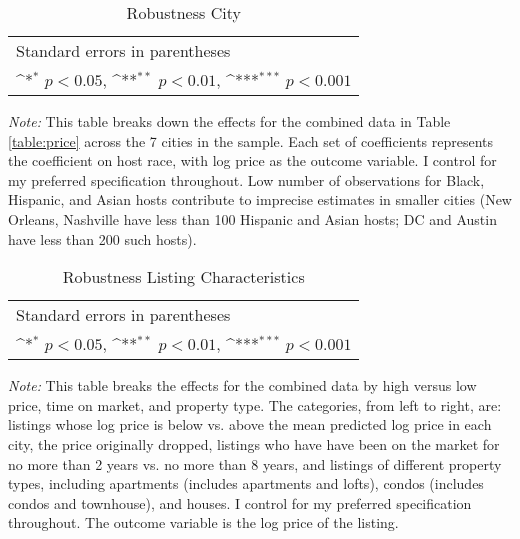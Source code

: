 \documentclass[11pt, oneside]{article}
\begin{document}
\newpage
\begin{table}[htbp]\centering
	\def\sym#1{\ifmmode^{#1}\else\(^{#1}\)\fi}
	\caption{Robustness City}
	\begin{tabular}{l*{7}{c}}
		\hline\hline
		
		\hline\hline
		\multicolumn{8}{l}{\footnotesize Standard errors in parentheses}\\
		\multicolumn{8}{l}{\footnotesize \sym{*} \(p<0.05\), \sym{**} \(p<0.01\), \sym{***} \(p<0.001\)}\\
	\end{tabular}
	\begin{tablenotes}
		
			\item {\it Note:} This table breaks down the effects for the combined data in Table \ref{table:price} across the 7 cities in the sample. Each set of coefficients represents the coefficient on host race, with log price as the outcome variable. I control for my preferred specification throughout. Low number of observations for Black, Hispanic, and Asian hosts contribute to imprecise estimates in smaller cities (New Orleans, Nashville have less than 100 Hispanic and Asian hosts; DC and Austin have less than 200 such hosts). 
	\end{tablenotes}
\end{table}


\newpage

\newpage
\begin{landscape}
	\begin{table}[htbp]\centering
		\def\sym#1{\ifmmode^{#1}\else\(^{#1}\)\fi}
		\caption{Robustness Listing Characteristics}
		\begin{tabular}{l*{9}{c}}
			\hline\hline
			
			\hline\hline
			\multicolumn{10}{l}{\footnotesize Standard errors in parentheses}\\
			\multicolumn{10}{l}{\footnotesize \sym{*} \(p<0.05\), \sym{**} \(p<0.01\), \sym{***} \(p<0.001\)}\\
		\end{tabular}
		\begin{tablenotes}

			\item {\it Note:} This table breaks the effects for the combined data by high versus low price, time on market, and property type. The categories, from left to right, are: listings whose log price is below vs. above the mean predicted log price in each city, the price originally dropped, listings who have have been on the market for no more than 2 years vs. no more than 8 years, and listings of different property types, including apartments (includes apartments and lofts), condos (includes condos and townhouse), and houses. I control for my preferred specification throughout. The outcome variable is the log price of the listing.
		\end{tablenotes}
	\end{table}
\end{landscape}
\end{document}
